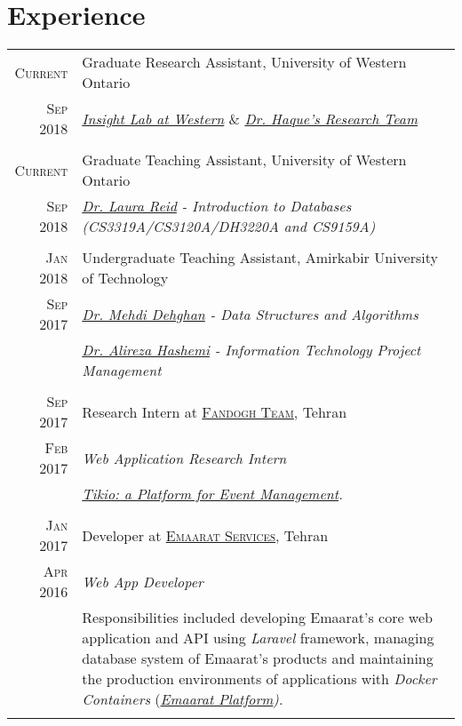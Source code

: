 \documentclass[a4paper,10pt]{article}
\begin{document}
\section{Experience}
\begin{longtable}{r|p{14.70cm}}
    \textsc{Current} & Graduate Research Assistant, University of Western Ontario \\
    \textsc{Sep 2018} & \emph{\href{http://insight.uwo.ca/}{Insight Lab at Western}} \& \emph{\href{http://www.csd.uwo.ca/faculty/ahaque32/research_team.html}{Dr. Haque's Research Team}} \\\multicolumn{2}{c}{} \\
    
    \textsc{Current} & Graduate Teaching Assistant, University of Western Ontario \\
    \textsc{Sep 2018} & \emph{\href{http://www.csd.uwo.ca/people/faculty/full_time_faculty.html}{Dr. Laura Reid} - Introduction to Databases (CS3319A/CS3120A/DH3220A and CS9159A)}\\\multicolumn{2}{c}{} \\

    \textsc{Jan 2018} & Undergraduate Teaching Assistant, Amirkabir University of Technology \\
    \textsc{Sep 2017} & \emph{\href{http://ceit.aut.ac.ir/~dehghan/}{Dr. Mehdi Dehghan} - Data Structures and Algorithms}\\ & \emph{\href{http://www.aut.ac.ir/sa.hashemi}{Dr. Alireza Hashemi} - Information Technology Project Management}\\\multicolumn{2}{c}{} \\

    \textsc{Sep 2017} & Research Intern at \textsc{\href{https://fandogh.org}{Fandogh Team}}, Tehran \\
    \textsc{Feb 2017} & \emph{Web Application Research Intern}\\
    & \textit{\href{https://tikio.io}{Tikio: a Platform for Event Management}.} \\\multicolumn{2}{c}{} \\
    
    \textsc{Jan 2017} & Developer at \textsc{\href{https://emaarat.com}{Emaarat Services}}, Tehran \\
    \textsc{Apr 2016} & \emph{Web App Developer}\\
    & \footnotesize{Responsibilities included developing Emaarat’s core web application and API using \textit{Laravel} framework, managing database system of Emaarat's products and maintaining the production environments of applications with \textit{Docker Containers} (\textit{\href{https://emaarat.com}{Emaarat Platform})}.}\\\multicolumn{2}{c}{} \\
    

\end{longtable}
\end{document}
